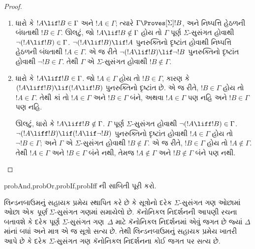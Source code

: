 \begin{proof}
\begin{enumerate}
  \item ધારો કે $!A \lif !B \in
      \Gamma$ અને $!A \in \Gamma$; ત્યારે $\Gamma \Proves[\Sigma] !B$,
      અને નિષ્પત્તિ હેઠળની બંધતાથી $!B \in \Gamma$. ઊલટું, જો $!A
      \lif !B \notin \Gamma$ હોય તો $\Gamma$ પૂર્ણ
      $\Sigma$-સુસંગત હોવાથી $\lnot (!A \lif !B) \in \Gamma$.
      $\lnot(!A \lif !B) \lif !A$ પુનરુક્તિનો દૃષ્ટાંત હોવાથી
      નિષ્પત્તિ હેઠળની બંધતાથી $!A \in \Gamma$. એ જ રીતે
      $\lnot(!A \lif !B) \lif \lnot !B$ પુનરુક્તિનો દૃષ્ટાંત હોવાથી
      $\lnot !B \in \Gamma$. તેથી $\Gamma$ એ $\Sigma$-સુસંગત
      હોવાથી $!B \notin \Gamma$.

  \item ધારો કે $!A \liff !B \in
      \Gamma$. જો $!A \in \Gamma$ હોય તો $!B \in \Gamma$, કારણ કે
      $(!A \liff !B) \lif (!A \lif !B)$ પુનરુક્તિનો દૃષ્ટાંત છે.
      એ જ રીતે, $!B \in \Gamma$ હોય તો $!A \in \Gamma$. તેથી કાં
      તો $!A \in \Gamma$ અને $!B \in \Gamma$ બંને, અથવા
      $!A \in \Gamma$ પણ નહિ અને $!B \in \Gamma$ પણ નહિ.

      ઊલટું, ધારો કે $!A \liff !B \notin \Gamma$. $\Gamma$ પૂર્ણ
      $\Sigma$-સુસંગત હોવાથી $\lnot (!A \liff !B) \in \Gamma$.
      $\lnot(!A \liff !B) \lif (!A \lif \lnot !B)$ પુનરુક્તિનો
      દૃષ્ટાંત હોવાથી $!A \in \Gamma$ હોય તો $\lnot !B \in
      \Gamma$; અને $\Gamma$ એ $\Sigma$-સુસંગત હોવાથી $!B \notin
      \Gamma$. એ જ રીતે, $!B \in \Gamma$ હોય તો $!A \notin \Gamma$.
      તેથી $!A \in \Gamma$ અને $!B \in \Gamma$ બંને નથી, તેમજ
      $!A \notin \Gamma$ અને $!B \notin \Gamma$ બંને પણ નથી.
  \end{enumerate}
\end{proof}

\begin{probtag}{probAnd,probOr,probIf,probIff}
  ની સાબિતી પૂરી કરો.
\end{probtag}
\endgroup

\begingroup
\makeatletter{}\makeatother


\label{guunit:OLP-0444}


લિન્ડનબાઉમનું સહાયક પ્રમેય સ્થાપિત કરે છે કે સૂત્રોનો દરેક
$\Sigma$-સુસંગત ગણ ઓછામાં ઓછા એક \emph{પૂર્ણ} $\Sigma$-સુસંગત ગણમાં
સમાયેલો છે. કૅનોનિકલ નિદર્શનની આપણી રચના બતાવશે કે દરેક પૂર્ણ
$\Sigma$-સુસંગત ગણ~$\Delta$ માટે કૅનોનિકલ નિદર્શનમાં એવું જગત છે
જ્યાં $\Delta$માંનાં બધાં અને માત્ર એ જ સૂત્રો સત્ય છે. તેથી
લિન્ડનબાઉમનું સહાયક પ્રમેય ખાતરી આપે છે કે દરેક $\Sigma$-સુસંગત ગણ
કૅનોનિકલ નિદર્શનના કોઈ જગત પર સત્ય છે.

